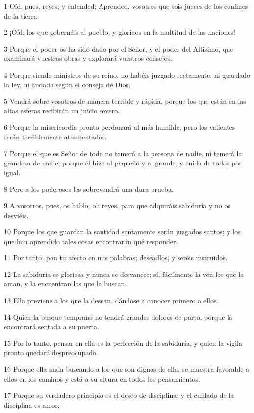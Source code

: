 \par 1 Oíd, pues, reyes, y entended; Aprended, vosotros que sois jueces de los confines de la tierra.
\par 2 ¡Oíd, los que gobernáis al pueblo, y gloriaos en la multitud de las naciones!
\par 3 Porque el poder os ha sido dado por el Señor, y el poder del Altísimo, que examinará vuestras obras y explorará vuestros consejos.
\par 4 Porque siendo ministros de su reino, no habéis juzgado rectamente, ni guardado la ley, ni andado según el consejo de Dios;
\par 5 Vendrá sobre vosotros de manera terrible y rápida, porque los que están en las altas esferas recibirán un juicio severo.
\par 6 Porque la misericordia pronto perdonará al más humilde, pero los valientes serán terriblemente atormentados.
\par 7 Porque el que es Señor de todo no temerá a la persona de nadie, ni temerá la grandeza de nadie; porque él hizo al pequeño y al grande, y cuida de todos por igual.
\par 8 Pero a los poderosos les sobrevendrá una dura prueba.
\par 9 A vosotros, pues, os hablo, oh reyes, para que adquiráis sabiduría y no os desviéis.
\par 10 Porque los que guardan la santidad santamente serán juzgados santos; y los que han aprendido tales cosas encontrarán qué responder.
\par 11 Por tanto, pon tu afecto en mis palabras; deseadlos, y seréis instruidos.
\par 12 La sabiduría es gloriosa y nunca se desvanece; sí, fácilmente la ven los que la aman, y la encuentran los que la buscan.
\par 13 Ella previene a los que la desean, dándose a conocer primero a ellos.
\par 14 Quien la busque temprano no tendrá grandes dolores de parto, porque la encontrará sentada a su puerta.
\par 15 Por lo tanto, pensar en ella es la perfección de la sabiduría, y quien la vigila pronto quedará despreocupado.
\par 16 Porque ella anda buscando a los que son dignos de ella, se muestra favorable a ellos en los caminos y está a su altura en todos los pensamientos.
\par 17 Porque su verdadero principio es el deseo de disciplina; y el cuidado de la disciplina es amor;
